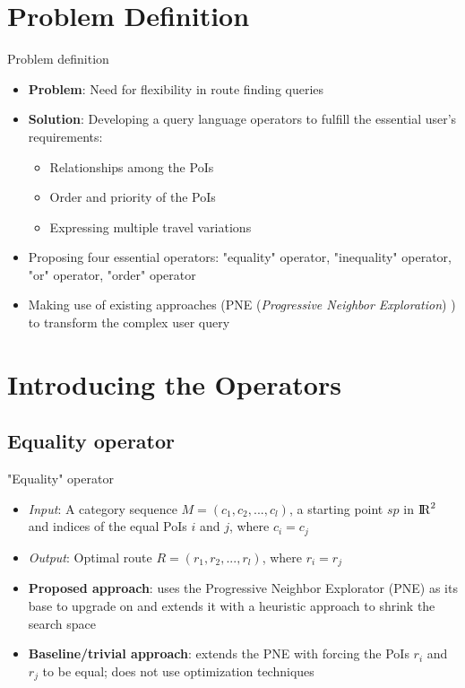 \documentclass[18pt]{beamer}
\begin{document}
\section{Problem Definition}
	\begin{frame}{Problem definition}
	
		\begin{itemize}
			\item \textbf{Problem}: Need for flexibility in route finding queries
			\item \textbf{Solution}: Developing a query language operators to fulfill the essential user's requirements:
			\begin{itemize}
				\item Relationships among the PoIs
				\item Order and priority of the PoIs
				\item Expressing multiple travel variations
				\newline
			\end{itemize}
		    \pause
		    \item Proposing four essential operators: "equality" operator, "inequality" operator, "or" operator, "order" operator
		    \item Making use of existing approaches (PNE (\textit{Progressive Neighbor Exploration}) \cite{osr}) to transform the complex user query 
		\end{itemize}
	
	\end{frame}

\section{Introducing the Operators}

	\subsection{Equality operator}
		\begin{frame}{"Equality" operator}
			
			\begin{itemize}
				\item \textit{Input}: A category sequence $M = (c_1, c_2, ..., c_l)$, a starting point $sp$ in ${\rm I\!R}^2$ and indices of the equal PoIs $i$ and $j$, where $c_i = c_j$
				\item \textit{Output}: Optimal route $R = (r_1, r_2, ..., r_l)$, where $r_i = r_j$ \newline
				\item \textbf{Proposed approach}: uses the Progressive Neighbor Explorator (PNE) as its base to upgrade on and extends it with a heuristic approach to shrink the search space
				\item \textbf{Baseline/trivial approach}: extends the PNE with forcing the PoIs $r_i$ and $r_j$ to be equal; does not use optimization techniques
			\end{itemize}
			
		\end{frame}
	
\end{document}
